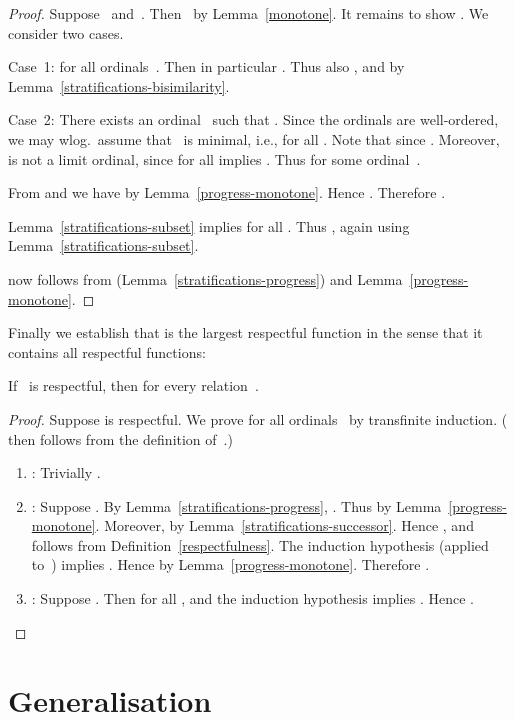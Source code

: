 \documentclass{CSML}
\theoremstyle{definition}
\begin{document}
\begin{proof}
Suppose~ and~.  Then~ by Lemma~\ref{monotone}.  It remains to show .  We consider two cases.

Case~1:  for all ordinals~.
Then in particular .  Thus also
, and  by Lemma~\ref{stratifications-bisimilarity}.

Case~2: There exists an ordinal~ such that .  Since the ordinals are well-ordered, we may
wlog.\ assume that~ is minimal, i.e.,  for all .  Note that  since .
Moreover,~ is not a limit ordinal, since  for all  implies .  Thus  for some
ordinal~.

From  and  we have  by Lemma~\ref{progress-monotone}.
Hence .  Therefore .

Lemma~\ref{stratifications-subset} implies  for all .  Thus , again using
Lemma~\ref{stratifications-subset}.

 now follows from  (Lemma~\ref{stratifications-progress})
and Lemma~\ref{progress-monotone}.
\end{proof}

Finally we establish that  is the largest respectful function in
the sense that it contains all respectful functions:

\begin{thm}
\label{lrf-is-largest}
If~ is respectful, then  for every
relation~.
\end{thm}

\begin{proof}
Suppose  is respectful.  We prove  for all ordinals~ by transfinite
induction.  ( then follows from the
definition of~.)

\begin{enumerate}
\item : Trivially .
\item : Suppose .  By Lemma~\ref{stratifications-progress},
  .  Thus  by Lemma~\ref{progress-monotone}.
  Moreover,  by
  Lemma~\ref{stratifications-successor}.  Hence , and 
  follows from Definition~\ref{respectfulness}.  The induction
  hypothesis (applied to~) implies
  .  Hence
   by
  Lemma~\ref{progress-monotone}.  Therefore .
\item : Suppose .  Then  for all , and the induction
  hypothesis implies .  Hence
  .\qedhere
\end{enumerate}
\end{proof}

\section{Generalisation}
\end{document}
